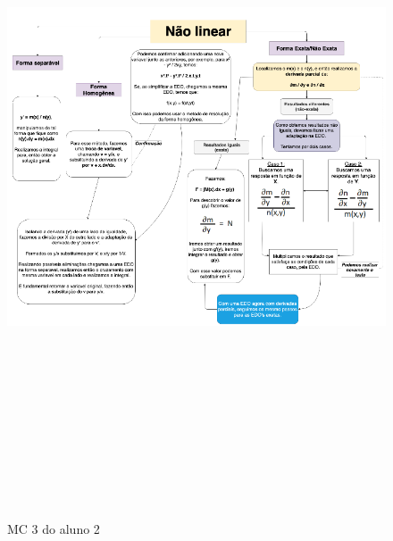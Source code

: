 \begin{landscape}
\begin{figure}[H]
\centering
\caption{MC 3 do aluno 2}
\includegraphics[width=170mm, height=200mm,keepaspectratio]{figuras/MC/mc2_3.png}
\label{mc3a2}
\end{figure}
\end{landscape}

